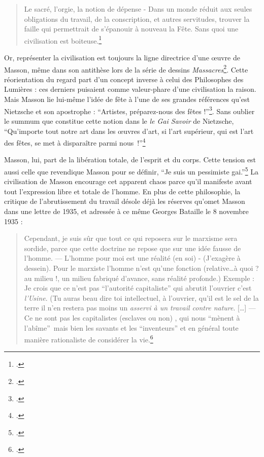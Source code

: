 \begin{quote}
Le sacré, l’orgie, la notion de dépense - Dans un monde réduit aux seules obligations du travail, de la conscription, et autres servitudes, trouver la faille qui permettrait de s’épanouir à nouveau la Fête. Sans quoi une civilisation est boiteuse.\footcite[p74]{rebelle}
\end{quote}

	Or, représenter la civilisation est toujours la ligne directrice d’une \oe{}uvre de Masson, même dans son antithèse lors de la série de dessins \emph{Massacres}\footcite{massacres}. Cette réorientation du regard part d’un concept inverse à celui des Philosophes des Lumières : ces derniers puisaient comme valeur-phare d’une civilisation la raison. Mais Masson lie lui-même l’idée de fête à l’une de ses grandes références qu’est Nietzsche  et son apostrophe  : \enquote{Artistes, préparez-nous des fêtes !}\footcite[p39]{memoiremonde}. Sans oublier le summum que constitue cette notion dans le \emph{le Gai Savoir} de Nietzsche, \enquote{Qu’importe tout notre art dans les œuvres d’art, si l’art supérieur, qui est l’art des fêtes, se met à disparaître parmi nous !}\footcite[]{nietzsche}

	Masson, lui, part de la libération totale, de l’esprit et du corps. Cette tension est aussi celle que revendique Masson pour se définir, \enquote{Je suis un pessimiste gai.}\footcite[p. 8]{memoiremonde} La civilisation de Masson encourage cet apparent chaos parce qu’il manifeste avant tout l’expression libre et totale de l’homme. En plus de cette philosophie, la critique de l’abrutissement du travail désole déjà les réserves qu’omet Masson dans une lettre de 1935, et adressée à ce même Georges Bataille le 8 novembre 1935 :
	
\begin{quote}Cependant, je suis sûr que tout ce qui reposera sur le marxisme sera sordide, parce que cette doctrine ne repose que sur une idée fausse de l’homme. — L’homme pour moi est une réalité (en soi) - (J’exagère à dessein). Pour le marxiste l’homme n’est qu’une fonction (relative…à quoi ? au milieu !, un milieu fabriqué d’avance, sans réalité profonde.) Exemple : Je crois que ce n’est pas \enquote{l’autorité capitaliste} qui abrutit l’ouvrier c’est \emph{l’Usine}. (Tu auras beau dire toi intellectuel, à l’ouvrier, qu’il est le sel de la terre il n’en restera pas moins un \emph{asservi à un travail contre nature}. […] — Ce ne sont pas les capitalistes (esclaves ou non) , qui nous \enquote{mènent à l’abîme} mais bien les savants et les \enquote{inventeurs} et en général toute manière rationaliste de considérer la vie.\footcite[p292]{anneessurrealistes}\end{quote}


